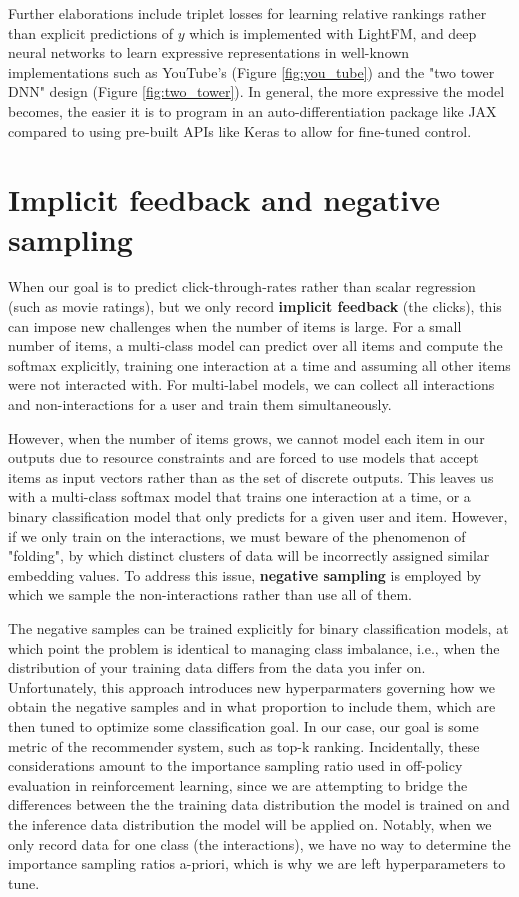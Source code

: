 \documentclass{article}
\begin{document}
Further elaborations include triplet losses for learning relative rankings rather than explicit predictions of $y$\cite{learning_to_rank_recsys} which is implemented with LightFM\cite{lightFM}, and deep neural networks to learn expressive representations in well-known implementations such as YouTube's\cite{youtube_recsys} (Figure \ref{fig:you_tube}) and the "two tower DNN" design\cite{google_recsys_two_tower} (Figure \ref{fig:two_tower}). In general, the more expressive the model becomes, the easier it is to program in an auto-differentiation package like JAX compared to using pre-built APIs like Keras to allow for fine-tuned control.

\section{Implicit feedback and negative sampling}

When our goal is to predict click-through-rates rather than scalar regression (such as movie ratings), but we only record \textbf{implicit feedback} (the clicks), this can impose new challenges when the number of items is large. For a small number of items, a multi-class model can predict over all items and compute the softmax explicitly, training one interaction at a time and assuming all other items were not interacted with. For multi-label models, we can collect all interactions and non-interactions for a user and train them simultaneously. 

However, when the number of items grows, we cannot model each item in our outputs due to resource constraints and are forced to use models that accept items as input vectors rather than as the set of discrete outputs. This leaves us with a multi-class softmax model that trains one interaction at a time, or a binary classification model that only predicts for a given user and item. However, if we only train on the interactions,  we must beware of the phenomenon of "folding", by which distinct clusters of data will be incorrectly assigned similar embedding values\cite{folding_without_negative_sampling_recsys}. To address this issue, \textbf{negative sampling} is employed by which we sample the non-interactions rather than use all of them. 

The negative samples can be trained explicitly for binary classification models, at which point the problem is identical to managing class imbalance, i.e., when the distribution of your training data differs from the data you infer on. Unfortunately, this approach introduces new hyperparmaters governing how we obtain the negative samples and in what proportion to include them, which are then tuned to optimize some classification goal. In our case, our goal is some metric of the recommender system, such as top-k ranking. Incidentally, these considerations amount to the importance sampling ratio used in off-policy evaluation in reinforcement learning, since we are attempting to bridge the differences between the the training data distribution the model is trained on and the inference data distribution the model will be applied on. Notably, when we only record data for one class (the interactions), we have no way to determine the importance sampling ratios a-priori, which is why we are left hyperparameters to tune.
\end{document}
